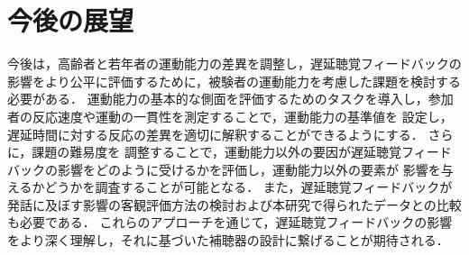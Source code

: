 \section{今後の展望}
今後は，高齢者と若年者の運動能力の差異を調整し，遅延聴覚フィードバックの影響をより公平に評価するために，被験者の運動能力を考慮した課題を検討する必要がある．
運動能力の基本的な側面を評価するためのタスクを導入し，参加者の反応速度や運動の一貫性を測定することで，運動能力の基準値を
設定し，遅延時間に対する反応の差異を適切に解釈することができるようにする．
さらに，課題の難易度を
調整することで，運動能力以外の要因が遅延聴覚フィードバックの影響をどのように受けるかを評価し，運動能力以外の要素が
影響を与えるかどうかを調査することが可能となる．
また，遅延聴覚フィードバックが発話に及ぼす影響の客観評価方法の検討および本研究で得られたデータとの比較も必要である．
これらのアプローチを通じて，遅延聴覚フィードバックの影響をより深く理解し，それに基づいた補聴器の設計に繋げることが期待される．